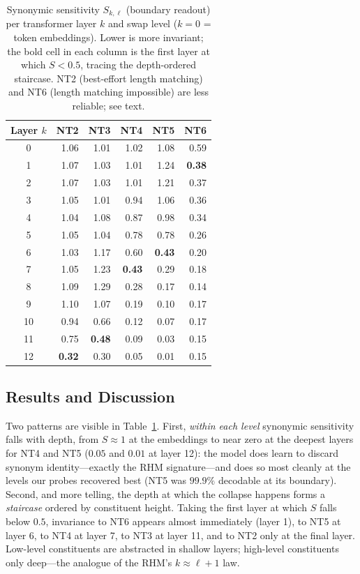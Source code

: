 \documentclass[10pt,twocolumn]{article}
\begin{document}
\begin{table}[h]
\centering
\caption{Synonymic sensitivity $S_{k,\ell}$ (boundary readout) per transformer layer $k$ and swap level ($k{=}0$ = token embeddings). Lower is more invariant; the bold cell in each column is the first layer at which $S<0.5$, tracing the depth-ordered staircase. NT2 (best-effort length matching) and NT6 (length matching impossible) are less reliable; see text.}
\label{tab:synonymic}
\setlength{\tabcolsep}{6pt}
\small
\begin{tabular}{crrrrr}
\toprule
\textbf{Layer }$k$ & \textbf{NT2} & \textbf{NT3} & \textbf{NT4} & \textbf{NT5} & \textbf{NT6} \\
\midrule
0  & 1.06 & 1.01 & 1.02 & 1.08 & 0.59 \\
1  & 1.07 & 1.03 & 1.01 & 1.24 & \textbf{0.38} \\
2  & 1.07 & 1.03 & 1.01 & 1.21 & 0.37 \\
3  & 1.05 & 1.01 & 0.94 & 1.06 & 0.36 \\
4  & 1.04 & 1.08 & 0.87 & 0.98 & 0.34 \\
5  & 1.05 & 1.04 & 0.78 & 0.78 & 0.26 \\
6  & 1.03 & 1.17 & 0.60 & \textbf{0.43} & 0.20 \\
7  & 1.05 & 1.23 & \textbf{0.43} & 0.29 & 0.18 \\
8  & 1.09 & 1.29 & 0.28 & 0.17 & 0.14 \\
9  & 1.10 & 1.07 & 0.19 & 0.10 & 0.17 \\
10 & 0.94 & 0.66 & 0.12 & 0.07 & 0.17 \\
11 & 0.75 & \textbf{0.48} & 0.09 & 0.03 & 0.15 \\
12 & \textbf{0.32} & 0.30 & 0.05 & 0.01 & 0.15 \\
\bottomrule
\end{tabular}
\end{table}

\subsection{Results and Discussion}

Two patterns are visible in Table~\ref{tab:synonymic}. First, \emph{within each level} synonymic sensitivity falls with depth, from $S\approx 1$ at the embeddings to near zero at the deepest layers for NT4 and NT5 ($0.05$ and $0.01$ at layer 12): the model does learn to discard synonym identity---exactly the RHM signature---and does so most cleanly at the levels our probes recovered best (NT5 was $99.9\%$ decodable at its boundary). Second, and more telling, the depth at which the collapse happens forms a \emph{staircase} ordered by constituent height. Taking the first layer at which $S$ falls below $0.5$, invariance to NT6 appears almost immediately (layer 1), to NT5 at layer 6, to NT4 at layer 7, to NT3 at layer 11, and to NT2 only at the final layer. Low-level constituents are abstracted in shallow layers; high-level constituents only deep---the analogue of the RHM's $k\approx\ell+1$ law.
\end{document}
